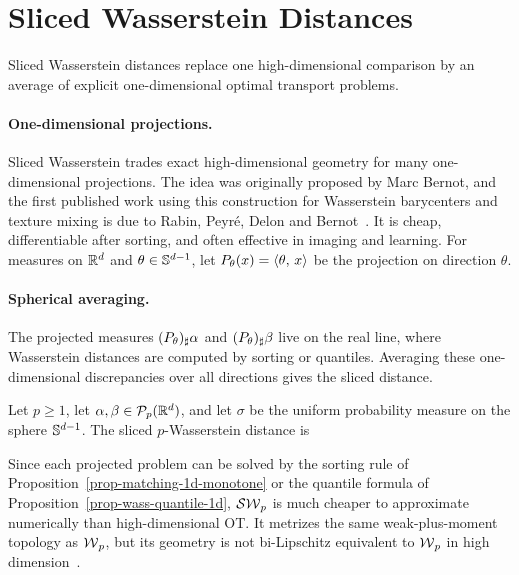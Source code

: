 \section{Sliced Wasserstein Distances}
\label{sec-sliced-wasserstein}

Sliced Wasserstein distances replace one high-dimensional comparison by an average of explicit one-dimensional optimal transport problems.

\paragraph{One-dimensional projections.}
Sliced Wasserstein trades exact high-dimensional geometry for many one-dimensional projections. The idea was originally proposed by Marc Bernot, and the first published work using this construction for Wasserstein barycenters and texture mixing is due to Rabin, Peyr\'e, Delon and Bernot~\cite{rabin-ssvm-11}. It is cheap, differentiable after sorting, and often effective in imaging and learning. For measures on $\mathbb{R}^d$ and $\theta\in\mathbb{S}^{d-1}$, let $P_\theta(x)=\langle \theta,\,x\rangle$ be the projection on direction $\theta$.

\paragraph{Spherical averaging.}
The projected measures $(P_\theta)_\sharp\alpha$ and $(P_\theta)_\sharp\beta$ live on the real line, where Wasserstein distances are computed by sorting or quantiles. Averaging these one-dimensional discrepancies over all directions gives the sliced distance.

\begin{defn}\label{def-sliced-wasserstein}
	Let $p\geq1$, let $\alpha,\beta\in\mathcal{P}_p(\mathbb{R}^d)$, and let $\sigma$ be the uniform probability measure on the sphere $\mathbb{S}^{d-1}$. The sliced $p$-Wasserstein distance is
\end{defn}
Since each projected problem can be solved by the sorting rule of Proposition~\ref{prop-matching-1d-monotone} or the quantile formula of Proposition~\ref{prop-wass-quantile-1d}, $\operatorname{\mathcal{SW}}_p$ is much cheaper to approximate numerically than high-dimensional OT\@. It metrizes the same weak-plus-moment topology as $\operatorname{\mathcal{W}}_p$, but its geometry is not bi-Lipschitz equivalent to $\operatorname{\mathcal{W}}_p$ in high dimension~\cite{nadjahi2019asymptotic}.


